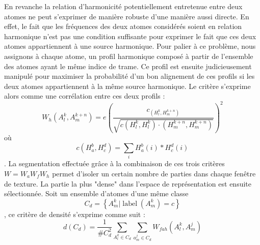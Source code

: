 En revanche la relation d'harmonicité potentiellement entretenue entre deux atomes ne peut s'exprimer de manière robuste d'une manière aussi directe. En effet, le fait que les fréquences des deux atomes considérés soient en relation harmonique n'est pas une condition suffisante pour exprimer le fait que ces deux atomes appartiennent à une source harmonique. Pour palier à ce problème, nous assignons à chaque atome, un profil harmonique composé à partir de l'ensemble des atomes ayant le même indice de trame. Ce profil est ensuite judicieusement manipulé pour maximiser la probabilité d'un bon alignement de ces profils si les deux atomes appartiennent à la même source harmonique\cite{lagrangeTaslp08}. Le critère s'exprime alors comme une corrélation entre ces deux profils :
\begin{equation}
  { W _ { h } \left( A _ { l } ^ { k } , A _ { m } ^ { k + n } \right) = e \left( \frac { c _ { \left( H _ { l } ^ { k } , H _ { m } ^ { k + n } \right) } } { \sqrt { c \left( H _ { l } ^ { k } , H _ { l } ^ { k } \right) \cdot \left( H _ { m } ^ { k + n } , H _ { m } ^ { k + n } \right) } } \right) ^ { 2 } }
\end{equation}
où
\begin{equation}
  { c \left( H _ { a } ^ { b } , H _ { c } ^ { d } \right) = \sum _ { i } H _ { a } ^ { b } ( i ) * H _ { c } ^ { d } ( i ) }
  \end{equation}.
  La segmentation effectuée grâce à la combinaison de ces trois critères $W = W_a W_f W_h$ permet d'isoler un certain nombre de parties dans chaque fenêtre de texture. La partie la plus "dense" dans l'espace de représentation est ensuite sélectionnée. Soit un ensemble d'atomes d'une même classe
  $$C _ { d } = \left\{ A _ { m } ^ { k } | \operatorname { label } \left( A _ { m } ^ { k } \right) = c \right\}$$,
  ce critère de densité s'exprime comme suit :
  \begin{equation}
    d \left( C _ { d } \right) = \frac { 1 } { \# C _ { d } ^ { 2 } } \sum _ { A _ { l } ^ { k } \in C _ { d } } \sum _ { a _ { m } ^ { j } \in C _ { d } } W _ { f a h } \left( A _ { l } ^ { k } , A _ { m } ^ { j } \right)
  \end{equation}




